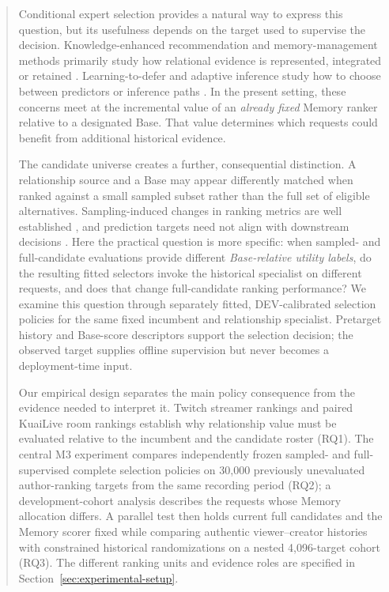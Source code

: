 \begin{abstract}
Conditional expert selection provides a natural way to express this question, but its usefulness depends on the target used to supervise the decision. Knowledge-enhanced recommendation and memory-management methods primarily study how relational evidence is represented, integrated or retained \cite{xie2026mhgfcl,zhong2026samd}. Learning-to-defer and adaptive inference study how to choose between predictors or inference paths \cite{mozannar2020defer,mao2024regression,yuan2026dsframe}. In the present setting, these concerns meet at the incremental value of an \emph{already fixed} Memory ranker relative to a designated Base. That value determines which requests could benefit from additional historical evidence.

The candidate universe creates a further, consequential distinction. A relationship source and a Base may appear differently matched when ranked against a small sampled subset rather than the full set of eligible alternatives. Sampling-induced changes in ranking metrics are well established \cite{krichene2020kdd}, and prediction targets need not align with downstream decisions \cite{mandi2024decisionfocused}. Here the practical question is more specific: when sampled- and full-candidate evaluations provide different \emph{Base-relative utility labels}, do the resulting fitted selectors invoke the historical specialist on different requests, and does that change full-candidate ranking performance? We examine this question through separately fitted, DEV-calibrated selection policies for the same fixed incumbent and relationship specialist. Pretarget history and Base-score descriptors support the selection decision; the observed target supplies offline supervision but never becomes a deployment-time input.

Our empirical design separates the main policy consequence from the evidence needed to interpret it. Twitch streamer rankings and paired KuaiLive room rankings establish why relationship value must be evaluated relative to the incumbent and the candidate roster (RQ1). The central M3 experiment compares independently frozen sampled- and full-supervised complete selection policies on 30,000 previously unevaluated author-ranking targets from the same recording period (RQ2); a development-cohort analysis describes the requests whose Memory allocation differs. A parallel test then holds current full candidates and the Memory scorer fixed while comparing authentic viewer--creator histories with constrained historical randomizations on a nested 4,096-target cohort (RQ3). The different ranking units and evidence roles are specified in Section~\ref{sec:experimental-setup}.


\end{abstract}
